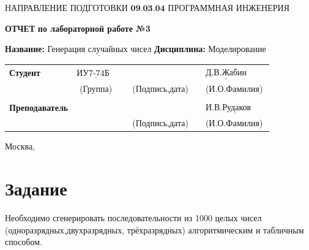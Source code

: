 \documentclass[12pt,a4paper,oneside]{report}
\begin{document}
	\noindent НАПРАВЛЕНИЕ ПОДГОТОВКИ $\underline{\textbf{09.03.04 ПРОГРАММНАЯ ИНЖЕНЕРИЯ}}$\newline\newline\newline\newline\newline\newline\newline
	\begin{center}
		\begin{flushright}
			\Large\textbf{ОТЧЕТ}\newline
			\Large\textbf{по лабораторной работе №3}\newline
		\end{flushright}
	\end{center}
	\noindent\textbf{Название:} $\underline{\text{Генерация случайных чисел}}$\newline\newline
	\noindent\textbf{Дисциплина:} $\underline{\text{Моделирование}}$\newline\newline\newline\newline\newline\newline\newline\newline
	\begin{tabular}{lcp{5em}lp{2em}l}
		\noindent\textbf{Студент} &  $\underline{\text{ИУ7-74Б~~}}$ &             &\hspace{1cm} & & $\underline{\text{Д.В.Жабин}}$ \\\cline{4-3}
		& (Группа) & &(Подпись,дата)  & & (И.О.Фамилия) \\
		& & & & &\\
		\noindent\textbf{Преподаватель} &  & &\hspace{1cm} & &$\underline{\text{И.В.Рудаков ~~~~}}$ \\\cline{4-3} 
		&  & & (Подпись,дата)  & &(И.О.Фамилия) \\
	\end{tabular}
	\begin{center}
		\vfill
		Москва, \the\year
	\end{center}
	\clearpage
	
	
	
	\section*{Задание}
	\quad Необходимо сгенерировать последовательности из 1000 целых чисел (одноразрядных,\newline двухразрядных, трёхразрядных) алгоритмическим и табличным способом.
	
\end{document}
